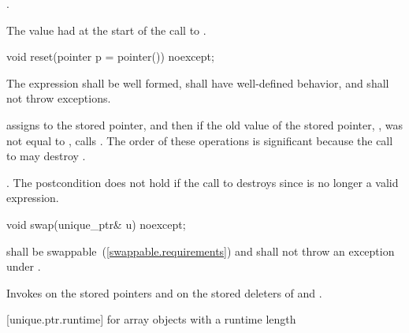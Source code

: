 \begin{itemdescr}
\pnum
\postcondition {}.

\pnum
\returns The value  had at the start of
the call to .
\end{itemdescr}

\begin{itemdecl}
void reset(pointer p = pointer()) noexcept;
\end{itemdecl}

\begin{itemdescr}
\pnum
\requires The expression  shall be well formed, shall have
well-defined behavior, and shall not throw exceptions.

\pnum
\effects assigns  to the stored pointer, and then if the old value of the
stored pointer, , was not equal to , calls
. \enternote The order of these operations is significant
because the call to  may destroy . \exitnote

\pnum
\postconditions {}.
\enternote The postcondition does not hold if the call to 
destroys  since  is no longer a valid expression.
\exitnote
\end{itemdescr}

\begin{itemdecl}
void swap(unique_ptr& u) noexcept;
\end{itemdecl}

\begin{itemdescr}
\pnum
\requires {} shall be
swappable~(\ref{swappable.requirements}) and shall
not throw an exception
under .

\pnum
\effects Invokes  on the stored pointers and on the stored
deleters of  and .
\end{itemdescr}

[unique.ptr.runtime]{ for array objects with a runtime length}

